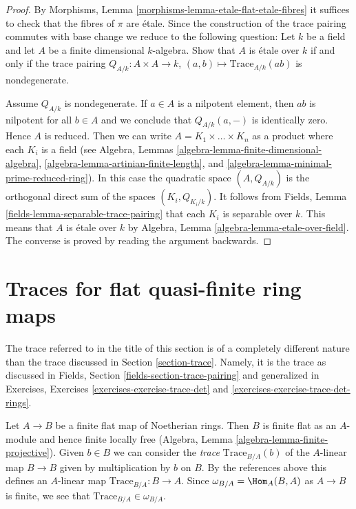 \begin{proof}
By Morphisms, Lemma \ref{morphisms-lemma-etale-flat-etale-fibres}
it suffices to check that the fibres of $\pi$ are \'etale.
Since the construction of the trace pairing commutes with base
change we reduce to the following question: Let $k$ be a field
and let $A$ be a finite dimensional $k$-algebra. Show that
$A$ is \'etale over $k$ if and only if the trace pairing
$Q_{A/k} : A \times A \to k$, $(a, b) \mapsto \text{Trace}_{A/k}(ab)$
is nondegenerate.

\medskip\noindent
Assume $Q_{A/k}$ is nondegenerate. If $a \in A$ is a nilpotent element, then
$ab$ is nilpotent for all $b \in A$ and we conclude that $Q_{A/k}(a, -)$ is
identically zero. Hence $A$ is reduced. Then we can write
$A = K_1 \times \ldots \times K_n$ as a product where each $K_i$
is a field (see
Algebra, Lemmas \ref{algebra-lemma-finite-dimensional-algebra},
\ref{algebra-lemma-artinian-finite-length}, and
\ref{algebra-lemma-minimal-prime-reduced-ring}).
In this case the quadratic
space $(A, Q_{A/k})$ is the orthogonal direct sum of the spaces
$(K_i, Q_{K_i/k})$. It follows from
Fields, Lemma \ref{fields-lemma-separable-trace-pairing}
that each $K_i$ is separable over $k$. This means that $A$ is \'etale
over $k$ by Algebra, Lemma \ref{algebra-lemma-etale-over-field}.
The converse is proved by reading the argument backwards.
\end{proof}





\section{Traces for flat quasi-finite ring maps}
\label{section-quasi-finite-traces}

\noindent
The trace referred to in the title of this section is of a completely
different nature than the trace discussed in
Section \ref{section-trace}. Namely, it is the trace
as discussed in Fields, Section \ref{fields-section-trace-pairing}
and generalized in Exercises, Exercises \ref{exercises-exercise-trace-det} and
\ref{exercises-exercise-trace-det-rings}.

\medskip\noindent
Let $A \to B$ be a finite flat map of Noetherian rings. Then $B$ is finite
flat as an $A$-module and hence finite locally free
(Algebra, Lemma \ref{algebra-lemma-finite-projective}).
Given $b \in B$ we can consider the {\it trace} $\text{Trace}_{B/A}(b)$
of the $A$-linear map $B \to B$ given by
multiplication by $b$ on $B$. By the references above this defines
an $A$-linear map $\text{Trace}_{B/A} : B \to A$.
Since $\omega_{B/A} = \Hom_A(B, A)$ as $A \to B$ is finite, we see
that $\text{Trace}_{B/A} \in \omega_{B/A}$.

